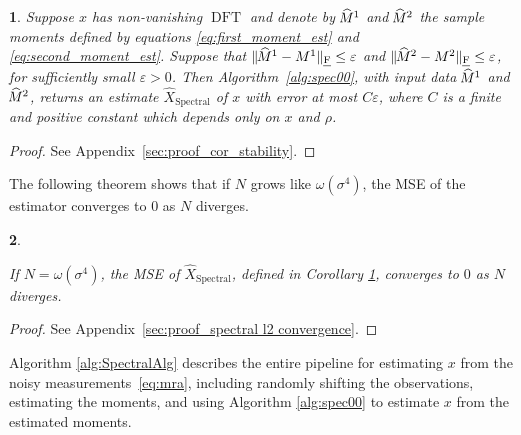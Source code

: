 \documentclass{IEEEtran}
\numberwithin{equation}{section}
\numberwithin{figure}{section}
\theoremstyle{plain}
\newtheorem{thm}{\protect\theoremname}[section]
\theoremstyle{definition}
\theoremstyle{remark}
\theoremstyle{plain}
\theoremstyle{remark}
\theoremstyle{plain}
\newtheorem{corollary}[thm]{\protect\corollaryname}
\theoremstyle{plain}
\theoremstyle{remark}
\providecommand{\theoremname}{Theorem}
\providecommand{\corollaryname}{Corollary}
\newcommand{\DFT}{\operatorname{DFT}}
\newcommand{\hatM}{\widehat{\hspace{-1pt}M}\phantom{\hspace{-11pt}M}}
\begin{document}
\begin{corollary}
	\label{cor:stability}
	Suppose $x$ has non-vanishing $\DFT$ and denote by $\hatM^1$ and $\hatM^2$ the sample moments defined by equations \eqref{eq:first_moment_est} and \eqref{eq:second_moment_est}. Suppose that $\| \hatM^1 - M^1\|_{\text{\emph{F}}} \le \varepsilon$ and $\| \hatM^2 - M^2 \|_{\text{\emph{F}}} \le \varepsilon$, for sufficiently small $\varepsilon > 0$. Then {Algorithm~\ref{alg:spec00}}, with input data $\hatM^1$ and $\hatM^2$, returns an estimate $\widehat{X}_{\text{Spectral}}$ of $x$ with error at most $C \varepsilon$, where $C$ is a finite and positive constant which depends only on $x$ and $\rho$.
	
\end{corollary}

\begin{proof}
	See Appendix~\ref{sec:proof_cor_stability}.
\end{proof}

The following theorem shows that if $N$ grows like $\omega(\sigma^4)$, the MSE of the estimator converges to $0$ as $N$ diverges.

\begin{thm}
	\label{thm:exp_decay}
	
	If $N=\omega(\sigma^4)$, the MSE of $\widehat{X}_{\text{Spectral}}$, defined in Corollary \ref{cor:stability}, converges to $0$ as $N$ diverges.

\end{thm}

\begin{proof}
	See Appendix~\ref{sec:proof_spectral l2 convergence}.
\end{proof}

Algorithm \ref{alg:SpectralAlg} describes the entire pipeline for estimating $x$ from the noisy measurements~\eqref{eq:mra}, including randomly shifting the observations, estimating the moments, and using Algorithm \ref{alg:spec00} to estimate $x$ from the estimated moments.
\end{document}
